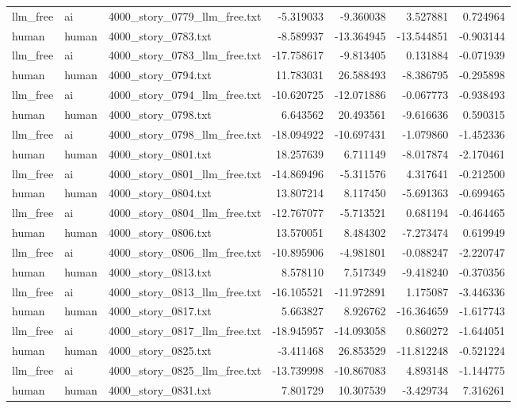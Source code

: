 \begin{longtable}{lllrrrr}
llm\_free & ai & 4000\_story\_0779\_llm\_free.txt & -5.319033 & -9.360038 & 3.527881 & 0.724964 \\
human & human & 4000\_story\_0783.txt & -8.589937 & -13.364945 & -13.544851 & -0.903144 \\
llm\_free & ai & 4000\_story\_0783\_llm\_free.txt & -17.758617 & -9.813405 & 0.131884 & -0.071939 \\
human & human & 4000\_story\_0794.txt & 11.783031 & 26.588493 & -8.386795 & -0.295898 \\
llm\_free & ai & 4000\_story\_0794\_llm\_free.txt & -10.620725 & -12.071886 & -0.067773 & -0.938493 \\
human & human & 4000\_story\_0798.txt & 6.643562 & 20.493561 & -9.616636 & 0.590315 \\
llm\_free & ai & 4000\_story\_0798\_llm\_free.txt & -18.094922 & -10.697431 & -1.079860 & -1.452336 \\
human & human & 4000\_story\_0801.txt & 18.257639 & 6.711149 & -8.017874 & -2.170461 \\
llm\_free & ai & 4000\_story\_0801\_llm\_free.txt & -14.869496 & -5.311576 & 4.317641 & -0.212500 \\
human & human & 4000\_story\_0804.txt & 13.807214 & 8.117450 & -5.691363 & -0.699465 \\
llm\_free & ai & 4000\_story\_0804\_llm\_free.txt & -12.767077 & -5.713521 & 0.681194 & -0.464465 \\
human & human & 4000\_story\_0806.txt & 13.570051 & 8.484302 & -7.273474 & 0.619949 \\
llm\_free & ai & 4000\_story\_0806\_llm\_free.txt & -10.895906 & -4.981801 & -0.088247 & -2.220747 \\
human & human & 4000\_story\_0813.txt & 8.578110 & 7.517349 & -9.418240 & -0.370356 \\
llm\_free & ai & 4000\_story\_0813\_llm\_free.txt & -16.105521 & -11.972891 & 1.175087 & -3.446336 \\
human & human & 4000\_story\_0817.txt & 5.663827 & 8.926762 & -16.364659 & -1.617743 \\
llm\_free & ai & 4000\_story\_0817\_llm\_free.txt & -18.945957 & -14.093058 & 0.860272 & -1.644051 \\
human & human & 4000\_story\_0825.txt & -3.411468 & 26.853529 & -11.812248 & -0.521224 \\
llm\_free & ai & 4000\_story\_0825\_llm\_free.txt & -13.739998 & -10.867083 & 4.893148 & -1.144775 \\
human & human & 4000\_story\_0831.txt & 7.801729 & 10.307539 & -3.429734 & 7.316261 \\

\end{longtable}
